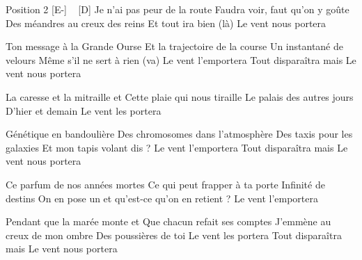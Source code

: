 Position 2
[E-] ~ [D]
Je n'ai pas peur de la route
Faudra voir, faut qu'on y goûte
Des méandres au creux des reins
Et tout ira bien (là)
Le vent nous portera

Ton message à la Grande Ourse
Et la trajectoire de la course
Un instantané de velours
Même s'il ne sert à rien (va)
Le vent l'emportera
Tout disparaîtra mais
Le vent nous portera

La caresse et la mitraille
et Cette plaie qui nous tiraille
Le palais des autres jours
D'hier et demain
Le vent les portera

Génétique en bandoulière
Des chromosomes dans l'atmosphère
Des taxis pour les galaxies
Et mon tapis volant dis ?
Le vent l'emportera
Tout disparaîtra mais
Le vent nous portera

Ce parfum de nos années mortes
Ce qui peut frapper à ta porte
Infinité de destins
On en pose un et qu'est-ce qu'on en retient ?
Le vent l'emportera

Pendant que la marée monte
et Que chacun refait ses comptes
J'emmène au creux de mon ombre
Des poussières de toi
Le vent les portera
Tout disparaîtra mais
Le vent nous portera 